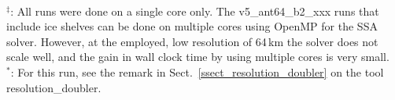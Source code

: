 \documentclass[12pt,a4paper]{article}
\begin{document}
\begin{appendix}
\begin{table}[ht]
{\protect\\
{}$^\ddagger$: All runs were done on a single core only. The v5\_ant64\_b2\_xxx runs that include ice shelves can be done on multiple cores using OpenMP for the SSA solver. However, at the employed, low resolution of 64\,km the solver does not scale well, and the gain in wall clock time by using multiple cores is very small.
\protect\\
{}$^\ast$: For this run, see the remark in Sect.~\ref{ssect_resolution_doubler} on the tool resolution\_doubler.}
\label{table_comp_times}
\end{table}

\vfill\rule{0mm}{0mm}

\clearpage

\end{appendix}




\end{document}
